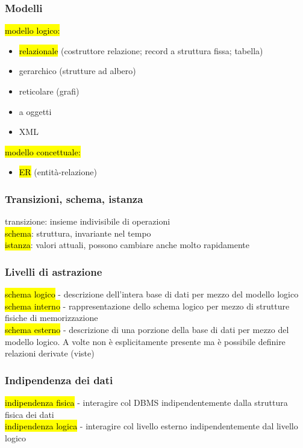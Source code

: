 \documentclass[a4paper]{article}
\begin{document}
\subsubsection{Modelli}
\hl{modello logico:}
\begin{itemize}[noitemsep]
  \item \hl{relazionale} (costruttore relazione; record a struttura fissa; tabella)
  \item gerarchico (strutture ad albero)
  \item reticolare (grafi)
  \item a oggetti
  \item XML
\end{itemize}
\hl{modello concettuale:}
\begin{itemize}[noitemsep]
  \item \hl{ER} (entità-relazione)
\end{itemize}

\subsubsection{Transizioni, schema, istanza}
transizione: insieme indivisibile di operazioni\medskip\\
%
\hl{schema}: struttura, invariante nel tempo\\
\hl{istanza}: valori attuali, possono cambiare anche molto rapidamente

\subsubsection{Livelli di astrazione}
\hl{schema logico} - descrizione dell’intera base di dati per mezzo del modello logico\\
\hl{schema interno} - rappresentazione dello schema logico per mezzo di strutture fisiche di memorizzazione\\
\hl{schema esterno} - descrizione di una porzione della base di dati per mezzo del modello logico. A volte non è esplicitamente presente ma è possibile definire relazioni derivate (viste)

\subsubsection{Indipendenza dei dati}
\hl{indipendenza fisica} - interagire col DBMS indipendentemente dalla struttura fisica dei dati\\
\hl{indipendenza logica} - interagire col livello esterno indipendentemente dal livello logico
\end{document}
